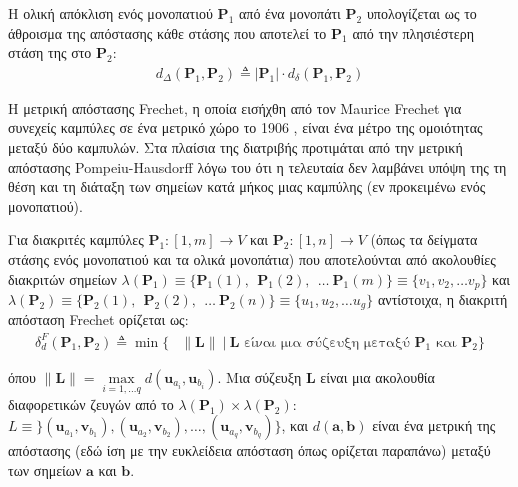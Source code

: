 \begin{bw_box}
\begin{definition}
Η ολική απόκλιση ενός μονοπατιού $\bm{P}_1$ από ένα μονοπάτι $\bm{P}_2$
υπολογίζεται ως το άθροισμα της απόστασης κάθε στάσης που αποτελεί το $\bm{P}_1$
από την πλησιέστερη στάση της στο $\bm{P}_2$:
\begin{align}
  d_{\Delta}(\bm{P}_1,\bm{P}_2) \triangleq |\bm{P}_1| \cdot d_{\delta}(\bm{P}_1,\bm{P}_2)
\end{align}
\end{definition}
\end{bw_box}


Η μετρική απόστασης Frechet, η οποία εισήχθη από τον Maurice Frechet για
συνεχείς καμπύλες σε ένα μετρικό χώρο το 1906 \cite{Frechet1906}, είναι ένα
μέτρο της ομοιότητας μεταξύ δύο καμπυλών. Στα πλαίσια της διατριβής προτιμάται
από την μετρική απόστασης Pompeiu-Hausdorff \cite{RockafellarR} λόγω του ότι η
τελευταία δεν λαμβάνει υπόψη της τη θέση και τη διάταξη των σημείων κατά μήκος
μιας καμπύλης (εν προκειμένω ενός μονοπατιού).


\begin{bw_box}
\begin{definition}
Για διακριτές καμπύλες
$\bm{P}_1 : [1, m] \rightarrow V$ και $\bm{P}_2 : [1, n] \rightarrow V$
(όπως τα δείγματα στάσης ενός μονοπατιού και τα ολικά μονοπάτια) που
αποτελούνται από ακολουθίες διακριτών σημείων
$\lambda(\bm{P}_1) \equiv \{\bm{P}_1(1),\ \ \bm{P}_1(2),\ \ \dots\ \bm{P}_1(m)\} \equiv \{v_1, v_2, \dots v_p\}$ και
$\lambda(\bm{P}_2) \equiv \{\bm{P}_2(1),\ \ \bm{P}_2(2),\ \ \dots\ \bm{P}_2(n)\} \equiv \{u_1, u_2, \dots u_g\}$
αντίστοιχα, η διακριτή απόσταση Frechet ορίζεται ως:
\begin{align}
  \delta_{d}^F(\bm{P}_1,\bm{P}_2) \triangleq \min\{ &\|\bm{L}\| \ | \ \bm{L} \text{ είναι μια σύζευξη μεταξύ } \bm{P}_1 \text{ και } \bm{P}_2 \}
\end{align}

όπου $\|\bm{L}\| = \max\limits_{i=1,\dots q} d(\bm{u}_{a_i}, \bm{u}_{b_i})$.
Μια σύζευξη $\bm{L}$ είναι μια ακολουθία διαφορετικών ζευγών από το
$\lambda(\bm{P}_1) \times \lambda(\bm{P}_2)$: $L \equiv \}(\bm{u}_{a_1},
\bm{v}_{b_1}), (\bm{u}_{a_2}, \bm{v}_{b_2}), \dots , (\bm{u}_{a_q},
\bm{v}_{b_q})\}$, και $d(\bm{a},\bm{b})$ είναι ένα μετρική της απόστασης (εδώ
ίση με την ευκλείδεια απόσταση όπως ορίζεται παραπάνω) μεταξύ των σημείων
$\bm{a}$ και $\bm{b}$.

\end{definition}
\end{bw_box}

